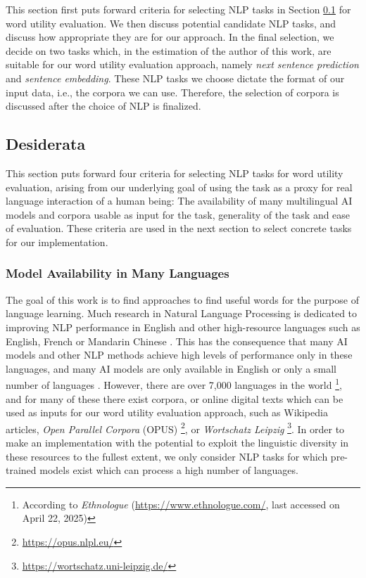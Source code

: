 This section first puts forward criteria for selecting NLP tasks in Section \ref{sec:nlp-tasks-desiderata} for word utility evaluation.
We then discuss potential candidate NLP tasks, and discuss how appropriate they are for our approach.
In the final selection, we decide on two tasks which, in the estimation of the author of this work, are suitable for our word utility evaluation approach, namely \textit{next sentence prediction} and \textit{sentence embedding}.
These NLP tasks we choose dictate the format of our input data, i.e., the corpora we can use.
Therefore, the selection of corpora is discussed after the choice of NLP is finalized.

\subsection{Desiderata} \label{sec:nlp-tasks-desiderata}

This section puts forward four criteria for selecting NLP tasks for word utility evaluation, arising from our underlying goal of using the task as a proxy for real language interaction of a human being:
The availability of many multilingual AI models and corpora usable as input for the task, generality of the task and ease of evaluation.
These criteria are used in the next section to select concrete tasks for our implementation.

\subsubsection{Model Availability in Many Languages}
The goal of this work is to find approaches to find useful words for the purpose of language learning.
Much research in Natural Language Processing is dedicated to improving NLP performance in English and other high-resource languages such as English, French or Mandarin Chinese \cite{joshiStateFateLinguistic2021}.
This has the consequence that many AI models and other NLP methods achieve high levels of performance only in these languages, and many AI models are only available in English or only a small number of languages \cite{joshiStateFateLinguistic2021}.
However, there are over 7,000 languages in the world \footnote{According to \textit{Ethnologue} (\url{https://www.ethnologue.com/}, last accessed on April 22, 2025)}, and for many of these there exist corpora, or online digital texts which can be used as inputs for our word utility evaluation approach, such as Wikipedia articles, \textit{Open Parallel Corpora}  (OPUS) \footnote{\url{https://opus.nlpl.eu/}}, or \textit{Wortschatz Leipzig} \footnote{\url{https://wortschatz.uni-leipzig.de/}}.
In order to make an implementation with the potential to exploit the linguistic diversity in these resources to the fullest extent, we only consider NLP tasks for which pre-trained models exist which can process a high number of languages.


